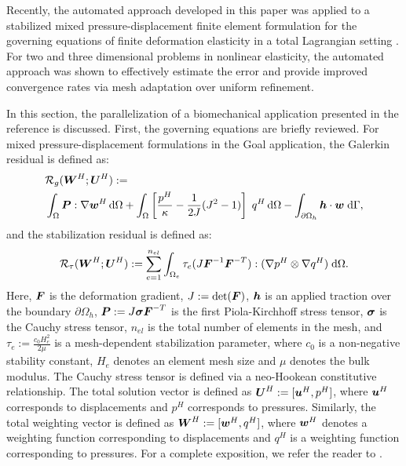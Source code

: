 Recently, the automated approach developed in this paper was applied
to a stabilized mixed pressure-displacement finite element formulation
\cite{ramesh2005stabilized} for the governing equations of finite
deformation elasticity in a total Lagrangian setting
\cite{granzow2017adjoint}. For two and three dimensional problems in
nonlinear elasticity, the automated approach was shown to effectively
estimate the error and provide improved convergence rates via mesh
adaptation over uniform refinement.

In this section, the parallelization of a biomechanical application
presented in the reference \cite{granzow2017adjoint} is discussed. First,
the governing equations are briefly reviewed. For mixed pressure-displacement
formulations in the Goal application, the Galerkin residual is
defined as:
%
\begin{gather}
\begin{aligned}
&\mathcal{R}_g(\boldsymbol{W}^H ; \boldsymbol{U}^H) := \\
&\int_{\Omega} \boldsymbol{P} : \nabla \boldsymbol{w}^H \, \text{d} \Omega +
\int_{\Omega} \left[ \frac{p^H}{\kappa} - \frac{1}{2 J}(J^2 - 1) \right] \;
q^H \, \text{d} \Omega -
\int_{\partial \Omega_h} \boldsymbol{h} \cdot \boldsymbol{w} \; \text{d} \Gamma,
\end{aligned}
\label{aut:mech_galerkin}
\end{gather}
%
and the stabilization residual is defined as:
%
\begin{gather}
\mathcal{R}_{\tau}(\boldsymbol{W}^H ; \boldsymbol{U}^H) :=
\sum_{e=1}^{n_{el}} \int_{\Omega_e} \tau_e
(J \boldsymbol{F}^{-1} \boldsymbol{F}^{-T}) : (\nabla p^H \otimes \nabla q^H) \;
\text{d} \Omega.
\label{aut_mech_stabilized}
\end{gather}
%
Here, $\boldsymbol{F}$ is the deformation gradient, $J := \text{det}(\boldsymbol{F})$,
$\boldsymbol{h}$ is an applied traction over the boundary $\partial \Omega_h$,
$\boldsymbol{P} := J \boldsymbol{\sigma} \boldsymbol{F}^{-T}$ is the first Piola-Kirchhoff
stress tensor, $\boldsymbol{\sigma}$ is the Cauchy stress tensor, $n_{el}$
is the total number of elements in the mesh, and $\tau_e :=
\frac{c_0 H_e^2}{2 \mu}$ is a mesh-dependent stabilization parameter,
where $c_0$ is a non-negative stability constant, $H_e$ denotes an
element mesh size and $\mu$ denotes the bulk modulus.
The Cauchy stress tensor is defined via a neo-Hookean constitutive
relationship.  The total
solution vector is defined as $\boldsymbol{U}^H := [\boldsymbol{u}^H, p^H]$, where
$\boldsymbol{u}^H$ corresponds to displacements and $p^H$ corresponds to
pressures. Similarly, the total weighting vector is defined as
$\boldsymbol{W}^H := [\boldsymbol{w}^H, q^H]$, where $\boldsymbol{w}^H$ denotes a weighting
function corresponding to displacements and $q^H$ is a weighting
function corresponding to pressures. For a complete
exposition, we refer the reader to \cite{granzow2017adjoint}.

